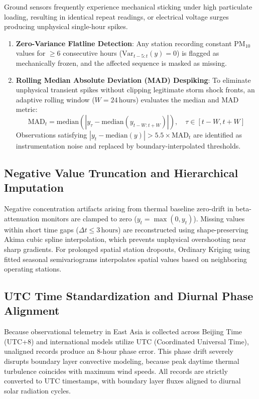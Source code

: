 Ground sensors frequently experience mechanical sticking under high particulate loading, resulting in identical repeat readings, or electrical voltage surges producing unphysical single-hour spikes.
\begin{enumerate}
    \item \textbf{Zero-Variance Flatline Detection}: Any station recording constant $\text{PM}_{10}$ values for $\ge 6$ consecutive hours ($\text{Var}_{t-5:t}(y) = 0$) is flagged as mechanically frozen, and the affected sequence is masked as missing.
    \item \textbf{Rolling Median Absolute Deviation (MAD) Despiking}: To eliminate unphysical transient spikes without clipping legitimate storm shock fronts, an adaptive rolling window ($W = 24\,\text{hours}$) evaluates the median and MAD metric:
    \begin{equation}
    \label{eq:mad_despiking}
    \text{MAD}_t = \text{median}\left(\left| y_\tau - \text{median}(y_{t-W:t+W}) \right|\right), \quad \tau \in [t-W, t+W]
    \end{equation}
    Observations satisfying $|y_t - \text{median}(y)| > 5.5 \times \text{MAD}_t$ are identified as instrumentation noise and replaced by boundary-interpolated thresholds.
\end{enumerate}

\subsection{Negative Value Truncation and Hierarchical Imputation}
\label{subsec:imputation}

Negative concentration artifacts arising from thermal baseline zero-drift in beta-attenuation monitors are clamped to zero ($y_t = \max(0, y_t)$). Missing values within short time gaps ($\Delta t \le 3\,\text{hours}$) are reconstructed using shape-preserving Akima cubic spline interpolation, which prevents unphysical overshooting near sharp gradients. For prolonged spatial station dropouts, Ordinary Kriging using fitted seasonal semivariograms interpolates spatial values based on neighboring operating stations.

\subsection{UTC Time Standardization and Diurnal Phase Alignment}
\label{subsec:utc_alignment}

Because observational telemetry in East Asia is collected across Beijing Time (UTC+8) and international models utilize UTC (Coordinated Universal Time), unaligned records produce an 8-hour phase error. This phase drift severely disrupts boundary layer convective modeling, because peak daytime thermal turbulence coincides with maximum wind speeds. All records are strictly converted to UTC timestamps, with boundary layer fluxes aligned to diurnal solar radiation cycles.

